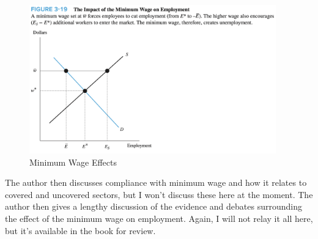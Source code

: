 \begin{figure}[!htb]
    \centering
        \includegraphics[width=0.95\textwidth]{../input/ch_3p10_min_wage_effect.png}
    \caption{Minimum Wage Effects}
    \label{fig:ch_3p10_min_wage_effect}
\end{figure}

\FloatBarrier

The author then discusses 
compliance with minimum wage and how it 
relates to covered and uncovered sectors, but I won't 
discuss these here at the moment.
The author then gives a lengthy discussion of 
the evidence and debates 
surrounding the effect of the minimum wage on employment.
Again, I will not 
relay it all here, but it's available in the book 
for review.